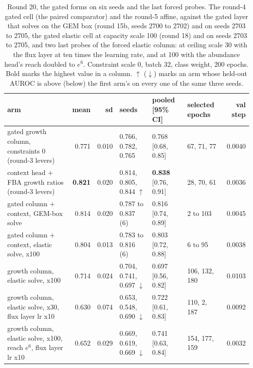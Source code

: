 \begin{table}[H]
  \centering
  \scriptsize
  \setlength{\tabcolsep}{3pt}
  \caption[Round 20, the gated forms on six seeds and the last forced probes]{Round 20, the gated forms on six seeds and the last forced probes. The round-4 gated cell (the paired comparator) and the round-5 affine, against the gated layer that solves on the GEM box (round 15b, seeds 2700 to 2702) and on seeds 2703 to 2705, the gated elastic cell at capacity scale 100 (round 18) and on seeds 2703 to 2705, and two last probes of the forced elastic column: at ceiling scale 30 with the flux layer at ten times the learning rate, and at 100 with the abundance head's reach doubled to $e^6$. Constraint scale 0, batch 32, class weight, 200 epochs. Bold marks the highest value in a column. $\uparrow$ ($\downarrow$) marks an arm whose held-out AUROC is above (below) the first arm's on every one of the same three seeds.}
  \label{tab:w36}
  \begin{tabular}{@{}lrrlllr@{}}
    \hline
    arm & mean & sd & seeds & pooled [95\% CI] & selected epochs & val step \\
    \hline
    gated growth column, constraints 0 (round-3 levers) & 0.771 & 0.010 & 0.766, 0.782, 0.765 & 0.768 [0.68, 0.85] & 67, 71, 77 & 0.0040 \\
    context head $+$ FBA growth ratios (round-3 levers) & \textbf{0.821} & 0.020 & 0.814, 0.805, 0.844 $\uparrow$ & \textbf{0.838} [0.76, 0.91] & 28, 70, 61 & 0.0036 \\
    gated column $+$ context, GEM-box solve & 0.814 & 0.020 & 0.787 to 0.837 (6) & 0.816 [0.74, 0.89] & 2 to 103 & 0.0045 \\
    gated column $+$ context, elastic solve, x100 & 0.804 & 0.013 & 0.783 to 0.816 (6) & 0.803 [0.72, 0.88] & 6 to 95 & 0.0038 \\
    growth column, elastic solve, x100 & 0.714 & 0.024 & 0.704, 0.741, 0.697 $\downarrow$ & 0.697 [0.56, 0.82] & 106, 132, 180 & 0.0103 \\
    growth column, elastic solve, x30, flux layer lr x10 & 0.630 & 0.074 & 0.653, 0.548, 0.690 $\downarrow$ & 0.722 [0.61, 0.83] & 110, 2, 187 & 0.0092 \\
    growth column, elastic solve, x100, reach $e^{6}$, flux layer lr x10 & 0.652 & 0.029 & 0.669, 0.619, 0.669 $\downarrow$ & 0.741 [0.63, 0.84] & 154, 177, 159 & 0.0032 \\
    \hline
  \end{tabular}
\end{table}
